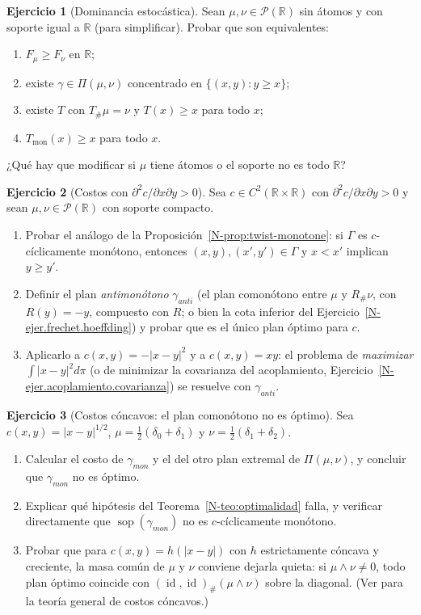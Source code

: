 \documentclass[11pt,a4paper]{amsart}
\newcounter{chapter}
\newcommand{\id}{\operatorname{id}}
\def\sop{\operatorname {\mathrm{sop}}}
\newcommand{\R}{{\mathbb R}}
\theoremstyle{remark}
\theoremstyle{definition}
\newtheorem{ejercicio}{Ejercicio}[chapter]
\numberwithin{subsection}{section}
\numberwithin{equation}{section}
\begin{document}
\begin{ejercicio}[Dominancia estocástica]\label{ejer.1D.dominancia}
Sean $\mu,\nu\in\mathcal P(\R)$ sin átomos y con soporte igual a $\R$
(para simplificar). Probar que son equivalentes:
\begin{enumerate}[label=(\alph*)]
\item $F_\mu\ge F_\nu$ en $\R$;
\item existe $\gamma\in\Pi(\mu,\nu)$ concentrado en $\{(x,y):y\ge x\}$;
\item existe $T$ con $T_\#\mu=\nu$ y $T(x)\ge x$ para todo $x$;
\item $T_\text{mon}(x)\ge x$ para todo $x$.
\end{enumerate}
¿Qué hay que modificar si $\mu$ tiene átomos o el soporte no es todo $\R$?
\end{ejercicio}

\begin{ejercicio}[Costos con $\partial^2c/\partial x\partial y>0$]\label{ejer.1D.antimonotono}
Sea $c\in C^2(\R\times\R)$ con $\partial^2c/\partial x\partial y>0$ y sean
$\mu,\nu\in\mathcal P(\R)$ con soporte compacto.
\begin{enumerate}[label=(\alph*)]
\item Probar el análogo de la Proposición~\ref{N-prop:twist-monotone}: si
$\Gamma$ es $c$-cíclicamente monótono, entonces $(x,y),(x',y')\in\Gamma$ y
$x<x'$ implican $y\ge y'$.
\item Definir el plan \emph{antimonótono} $\gamma_{anti}$ (el plan
comonótono entre $\mu$ y $R_\#\nu$, con $R(y)=-y$, compuesto con $R$; o bien
la cota inferior del Ejercicio~\ref{N-ejer.frechet.hoeffding}) y probar que es
el único plan óptimo para $c$.
\item Aplicarlo a $c(x,y)=-|x-y|^2$ y a $c(x,y)=xy$: el problema de
\emph{maximizar} $\int|x-y|^2d\pi$ (o de minimizar la covarianza del
acoplamiento, Ejercicio~\ref{N-ejer.acoplamiento.covarianza}) se resuelve con
$\gamma_{anti}$.
\end{enumerate}
\end{ejercicio}

\begin{ejercicio}[Costos cóncavos: el plan comonótono no es óptimo]\label{ejer.1D.concavo}
Sea $c(x,y)=|x-y|^{1/2}$, $\mu=\frac12(\delta_0+\delta_1)$ y
$\nu=\frac12(\delta_1+\delta_2)$.
\begin{enumerate}[label=(\alph*)]
\item Calcular el costo de $\gamma_{mon}$ y el del otro plan extremal de
$\Pi(\mu,\nu)$, y concluir que $\gamma_{mon}$ no es óptimo.
\item Explicar qué hipótesis del Teorema~\ref{N-teo:optimalidad} falla, y
verificar directamente que $\sop(\gamma_{mon})$ no es $c$-cíclicamente
monótono.
\item Probar que para $c(x,y)=h(|x-y|)$ con $h$ estrictamente cóncava y
creciente, la masa común de $\mu$ y $\nu$ conviene dejarla quieta: si
$\mu\wedge\nu\ne0$, todo plan óptimo coincide con $(\id,\id)_\#(\mu\wedge\nu)$
sobre la diagonal. (Ver \cite[Sec.~3.3.2]{Santambrogio} para la teoría
general de costos cóncavos.)
\end{enumerate}
\end{ejercicio}
\end{document}
